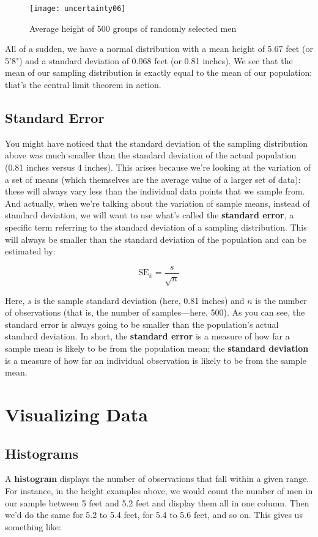 \begin{figure}[h!]
\texttt{[image: uncertainty06]}
\caption{Average height of 500 groups of randomly selected men}
\label{fig:uncertainty06}
\end{figure}

All of a sudden, we have a normal distribution with a mean height of 5.67 feet (or 5'8") and a standard deviation of 0.068 feet (or 0.81 inches). We see that the mean of our sampling distribution is exactly equal to the mean of our population: that's the central limit theorem in action.

\subsection{Standard Error}

You might have noticed that the standard deviation of the sampling distribution above was much smaller than the standard deviation of the actual population (0.81 inches versus 4 inches). This arises because we're looking at the variation of a set of means (which themselves are the average value of a larger set of data): these will always vary less than the individual data points that we sample from. And actually, when we're talking about the variation of sample means, instead of standard deviation, we will want to use what's called the \textbf{standard error}, a specific term referring to the standard deviation of a sampling distribution. This will always be smaller than the standard deviation of the population and can be estimated by:

\begin{equation}
\text{SE}_{\bar{x}}= \frac{s}{\sqrt{n}}
\end{equation}

Here, \(s\)  is the sample standard deviation (here, 0.81 inches) and \(n\)  is the number of observations (that is, the number of samples---here, 500). As you can see, the standard error is always going to be smaller than the population's actual standard deviation. In short, the \textbf{standard error} is a measure of how far a sample mean is likely to be from the population mean; the \textbf{standard deviation} is a measure of how far an individual observation is likely to be from the sample mean.

\section{Visualizing Data}

\subsection{Histograms}
A \textbf{histogram} displays the number of observations that fall within a given range. For instance, in the height examples above, we would count the number of men in our sample between 5 feet and 5.2 feet and display them all in one column. Then we'd do the same for 5.2 to 5.4 feet, for 5.4 to 5.6 feet, and so on. This gives us something like:

